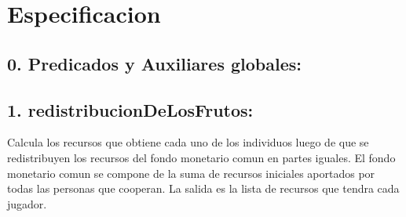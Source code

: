 \documentclass[10pt,a4paper]{article}
\begin{document}
\maketitle

\section{Especificacion}



\subsection*{0. Predicados y Auxiliares globales:}
	\hfill

		{
		}
	
	{}




\subsection*{1. redistribucionDeLosFrutos:}
	Calcula los recursos que obtiene cada uno de los individuos luego de que se redistribuyen
	los recursos del fondo monetario comun en partes iguales. El fondo monetario comun se compone de la suma de recursos
	iniciales aportados por todas las personas que cooperan. La salida es la lista de recursos que tendra cada jugador.
\end{document}
